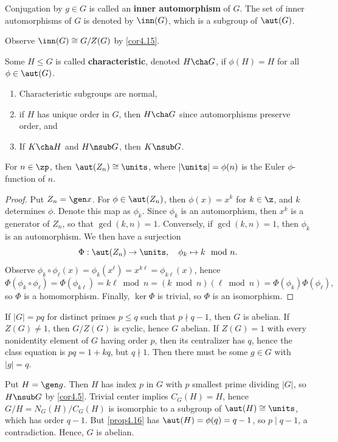  Conjugation by $g \in G$ is called an \textbf{inner automorphism} of $G$. The set of inner automorphisms of $G$ is denoted by $\inn(G)$, which is a subgroup of $\aut(G)$.

\note Observe $\inn(G) \cong G/Z(G)$ by \autoref{cor4.15}.

 Some $H \leq G$ is called \textbf{characteristic}, denoted $H \cha G$, if $\phi(H) = H$ for all $\phi \in \aut(G)$.

\note
\begin{enumerate}
    \item Characteristic subgroups are normal,
    \item if $H$ has unique order in $G$, then $H \cha G$ since automorphisms preserve order, and
    \item If $K \cha H$ and $H \nsub G$, then $K \nsub G$.
\end{enumerate}

 \label{prop4.16}
For $n \in \zp$, then $\aut(Z_n) \cong \units$, where $|\units| = \phi(n)$ is the Euler $\phi$-function of $n$.

\begin{proof}
    Put $Z_n = \gen x$. For $\phi \in \aut(Z_n)$, then $\phi(x) = x^k$ for $k \in \z$, and $k$ determines $\phi$. Denote this map as $\phi_k$. Since $\phi_k$ is an automorphism, then $x^k$ is a generator of $Z_n$, so that $\gcd(k, n) = 1$. Conversely, if $\gcd(k, n) = 1$, then $\phi_k$ is an automorphism. We then have a surjection
    \[\Phi : \aut(Z_n) \to \units, \quad \phi_k \mapsto k \mod n. \]
    Observe $\phi_k \circ \phi_\ell(x) = \phi_k(x^\ell) = x^{k\ell} = \phi_{k\ell}(x)$, hence
    \[\Phi(\phi_k \circ \phi_\ell) = \Phi(\phi_{k\ell}) = k\ell \bmod n = (k \bmod n)(\ell \bmod n) = \Phi(\phi_k)\Phi(\phi_\ell),\]
    so $\Phi$ is a homomorphism. Finally, $\ker\Phi$ is trivial, so $\Phi$ is an isomorphism.
\end{proof}

\ex If $|G| = pq$ for distinct primes $p \leq q$ such that $p \nmid q - 1$, then $G$ is abelian. If $Z(G) \neq 1$, then $G/Z(G)$ is cyclic, hence $G$ abelian. If $Z(G) = 1$ with every nonidentity element of $G$ having order $p$, then its centralizer has $q$, hence the class equation is $pq = 1 + kq$, but $q \nmid 1$. Then there must be some $g \in G$ with $|g| = q$.

Put $H = \gen g$. Then $H$ has index $p$ in $G$ with $p$ smallest prime dividing $|G|$, so $H \nsub G$ by \autoref{cor4.5}. Trivial center implies $C_G(H) = H$, hence $G/H = N_G(H)/C_G(H)$ is isomorphic to a subgroup of $\aut(H) \cong \units$, which has order $q - 1$. But \autoref{prop4.16} has $\aut(H) = \phi(q) = q - 1$, so $p \mid q - 1$, a contradiction. Hence, $G$ is abelian.

